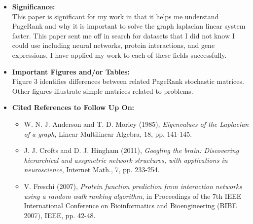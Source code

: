 \documentclass{article}
\begin{document}
\begin{itemize}
\item{\textbf{Significance:}}
\\
This paper is significant for my work in that it helps me understand PageRank and why it is important to solve the graph laplacian linear system faster. This paper sent me off in search for datasets that I did not know I could use including neural networks, protein interactions, and gene expressions. I have applied my work to each of these fields successfully.
\item{\textbf{Important Figures and/or Tables:}}
\\
Figure 3 identifies differences between related PageRank stochastic matrices. Other figures illustrate simple matrices related to problems.
\item{\textbf{Cited References to Follow Up On:}}
\\
\begin{itemize}
\item
W. N. J. Anderson and T. D. Morley (1985), \textit{Eigenvalues of the Laplacian of a graph}, Linear Multilinear Algebra, 18, pp. 141-145.
\item
J. J. Crofts and D. J. Hingham (2011), \textit{Googling the brain: Discovering hierarchical and assymetric network structures, with applications in neuroscience}, Internet Math., 7, pp. 233-254.
\item
V. Freschi (2007), \textit{Protein function prediction from interaction networks using a random walk ranking algorithm}, in Proceedings of the 7th IEEE International Conference on Bioinformatics and Bioengineering (BIBE 2007), IEEE, pp. 42-48.
\end{itemize}
\end{itemize}
\end{document}
